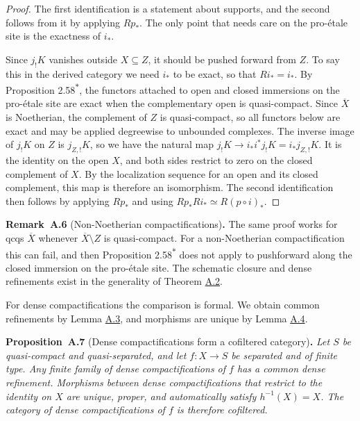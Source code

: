 \documentclass[11pt]{article}
\newenvironment{bpstatement}[2]{\par\addvspace{0.6\baselineskip}\noindent\textbf{#1}#2\textbf{.}\enspace\ignorespaces}
  {\par\addvspace{0.4\baselineskip}}
\newenvironment{bpstatementit}[2]{\begin{bpstatement}{#1}{#2}\itshape\ignorespaces}{\end{bpstatement}}
\newcommand{\bpout}[1]{#1\textsuperscript{\hyperlink{bp-outside}{\ensuremath{\ast}}}}
\begin{document}
\begin{proof}[{Proof}]\label{bp16}%
The first identification is a statement about supports, and the second follows from it by applying \(Rp_*\). The only point that needs care on the pro-étale site is the exactness of \(i_*\).

Since \(j_!K\) vanishes outside \(X\subseteq Z\), it should be pushed forward from \(Z\). To say this in the derived category we need \(i_*\) to be exact, so that \(Ri_*=i_*\). By Proposition \bpout{2.58}, the functors attached to open and closed immersions on the pro-étale site are exact when the complementary open is quasi-compact. Since \(\overline X\) is Noetherian, the complement of \(Z\) is quasi-compact, so all functors below are exact and may be applied degreewise to unbounded complexes. The inverse image of \(j_!K\) on \(Z\) is \(j_{Z,!}K\), so we have the natural map \(j_!K\to i_*i^*j_!K=i_*j_{Z,!}K\). It is the identity on the open \(X\), and both sides restrict to zero on the closed complement of \(X\). By the localization sequence for an open and its closed complement, this map is therefore an isomorphism. The second identification then follows by applying \(Rp_*\) and using \(Rp_*Ri_*\simeq R(p\circ i)_*\).
\end{proof}

\label{bp17}%
\begin{bpstatement}{Remark~A.6}{ (Non-Noetherian compactifications)}
The same proof works for qcqs \(\overline X\) whenever \(\overline X\setminus Z\) is quasi-compact. For a non-Noetherian compactification this can fail, and then Proposition \bpout{2.58} does not apply to pushforward along the closed immersion on the pro-étale site. The schematic closure and dense refinements exist in the generality of Theorem \hyperref[bp7]{A.2}.
\end{bpstatement}

\label{bp18}%
For dense compactifications the comparison is formal. We obtain common refinements by Lemma \hyperref[bp9]{A.3}, and morphisms are unique by Lemma \hyperref[bp12]{A.4}.

\label{bp19}%
\begin{bpstatementit}{Proposition~A.7}{ (Dense compactifications form a cofiltered category)}
Let \(S\) be quasi-compact and quasi-separated, and let \(f:X\to S\) be separated and of finite type. Any finite family of dense compactifications of \(f\) has a common dense refinement. Morphisms between dense compactifications that restrict to the identity on \(X\) are unique, proper, and automatically satisfy \(h^{-1}(X)=X\). The category of dense compactifications of \(f\) is therefore cofiltered.
\end{bpstatementit}
\end{document}
